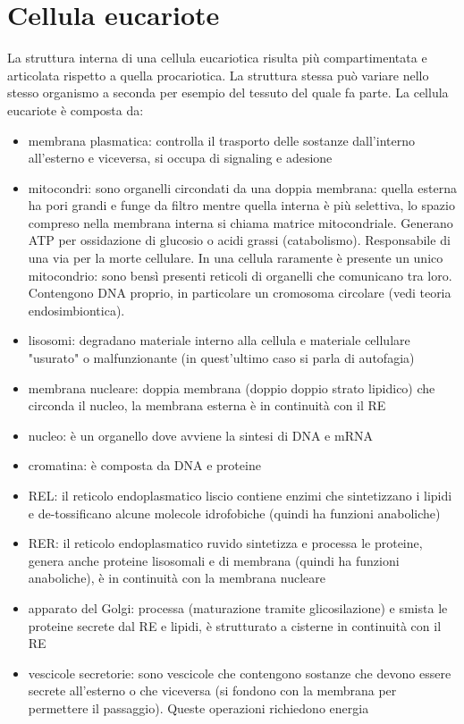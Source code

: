 \section{Cellula eucariote}
    La struttura interna di una cellula eucariotica risulta più compartimentata e articolata rispetto a quella procariotica. La struttura stessa può variare nello stesso organismo a seconda per esempio del tessuto del quale fa parte. La cellula eucariote è composta da:
    \begin{itemize}
        \item membrana plasmatica: controlla il trasporto delle sostanze dall'interno all'esterno e viceversa, si occupa di signaling e adesione
        \item mitocondri: sono organelli circondati da una doppia membrana: quella esterna ha pori grandi e funge da filtro mentre quella interna è più selettiva, lo spazio compreso nella membrana interna si chiama matrice mitocondriale. Generano ATP per ossidazione di glucosio o acidi grassi (catabolismo). Responsabile di una via per la morte cellulare. In una cellula raramente è presente un unico mitocondrio: sono bensì presenti reticoli di organelli che comunicano tra loro. Contengono DNA proprio, in particolare un cromosoma circolare (vedi teoria endosimbiontica).
        \item lisosomi: degradano materiale interno alla cellula e materiale cellulare "usurato" o malfunzionante (in quest'ultimo caso si parla di autofagia)
        \item membrana nucleare: doppia membrana (doppio doppio strato lipidico) che circonda il nucleo, la membrana esterna è in continuità con il RE
        \item nucleo: è un organello dove avviene la sintesi di DNA e mRNA
        \item cromatina: è composta da DNA e proteine
        \item REL: il reticolo endoplasmatico liscio contiene enzimi che sintetizzano i lipidi e de-tossificano alcune molecole idrofobiche (quindi ha funzioni anaboliche)
        \item RER: il reticolo endoplasmatico ruvido sintetizza e processa le proteine, genera anche proteine lisosomali e di membrana (quindi ha funzioni anaboliche), è in continuità con la membrana nucleare
        \item apparato del Golgi: processa (maturazione tramite glicosilazione) e smista le proteine secrete dal RE e lipidi, è strutturato a cisterne in continuità con il RE
        \item vescicole secretorie: sono vescicole che contengono sostanze che devono essere secrete all'esterno o che viceversa (si fondono con la membrana per permettere il passaggio). Queste operazioni richiedono energia

\end{itemize}
